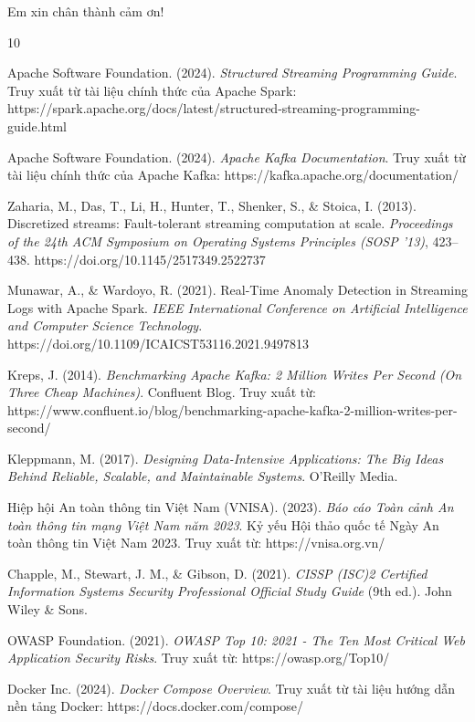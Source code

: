 \documentclass[12pt,a4paper]{report}
\begin{document}
Em xin chân thành cảm ơn!

\renewcommand{\bibname}{TÀI LIỆU THAM KHẢO} 

\begin{thebibliography}{10}

Apache Software Foundation. (2024). \textit{Structured Streaming Programming Guide}. Truy xuất từ tài liệu chính thức của Apache Spark: https://spark.apache.org/docs/latest/structured-streaming-programming-guide.html

Apache Software Foundation. (2024). \textit{Apache Kafka Documentation}. Truy xuất từ tài liệu chính thức của Apache Kafka: https://kafka.apache.org/documentation/

Zaharia, M., Das, T., Li, H., Hunter, T., Shenker, S., \& Stoica, I. (2013). Discretized streams: Fault-tolerant streaming computation at scale. \textit{Proceedings of the 24th ACM Symposium on Operating Systems Principles (SOSP '13)}, 423–438. https://doi.org/10.1145/2517349.2522737

Munawar, A., \& Wardoyo, R. (2021). Real-Time Anomaly Detection in Streaming Logs with Apache Spark. \textit{IEEE International Conference on Artificial Intelligence and Computer Science Technology}. https://doi.org/10.1109/ICAICST53116.2021.9497813

Kreps, J. (2014). \textit{Benchmarking Apache Kafka: 2 Million Writes Per Second (On Three Cheap Machines)}. Confluent Blog. Truy xuất từ: https://www.confluent.io/blog/benchmarking-apache-kafka-2-million-writes-per-second/

Kleppmann, M. (2017). \textit{Designing Data-Intensive Applications: The Big Ideas Behind Reliable, Scalable, and Maintainable Systems}. O'Reilly Media.

Hiệp hội An toàn thông tin Việt Nam (VNISA). (2023). \textit{Báo cáo Toàn cảnh An toàn thông tin mạng Việt Nam năm 2023}. Kỷ yếu Hội thảo quốc tế Ngày An toàn thông tin Việt Nam 2023. Truy xuất từ: https://vnisa.org.vn/

Chapple, M., Stewart, J. M., \& Gibson, D. (2021). \textit{CISSP (ISC)2 Certified Information Systems Security Professional Official Study Guide} (9th ed.). John Wiley \& Sons.

OWASP Foundation. (2021). \textit{OWASP Top 10: 2021 - The Ten Most Critical Web Application Security Risks}. Truy xuất từ: https://owasp.org/Top10/

Docker Inc. (2024). \textit{Docker Compose Overview}. Truy xuất từ tài liệu hướng dẫn nền tảng Docker: https://docs.docker.com/compose/

\end{thebibliography}
\end{document}
